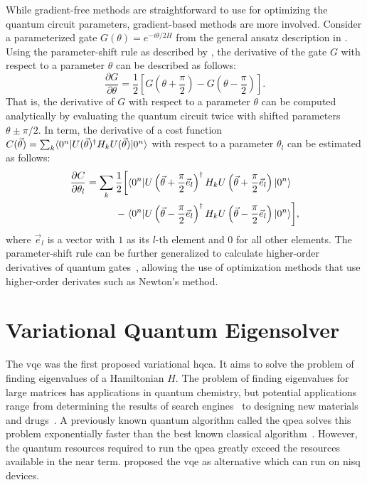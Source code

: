 While gradient-free methods are straightforward to use for optimizing the quantum circuit parameters, gradient-based methods are more involved.
Consider a parameterized gate $G(\theta) = e^{-i\theta/2 H}$ from the general ansatz description in .
Using the parameter-shift rule as described by \textcite{schuld2019evaluating}, the derivative of the gate $G$ with respect to a parameter $\theta$ can be described as follows:
\begin{equation}
\dfrac{\partial G}{\partial \theta} = \dfrac{1}{2}\left[G\left(\theta + \dfrac{\pi}{2}\right) - G\left(\theta - \dfrac{\pi}{2}\right)\right].
\end{equation}
That is, the derivative of $G$ with respect to a parameter $\theta$ can be computed analytically by evaluating the quantum circuit twice with shifted parameters $\theta \pm \pi/2$.
In term, the derivative of a cost function $C(\vec{\theta}) = \sum_k \langle{0^n}\vert U(\vec{\theta})^\dagger H_k U(\vec{\theta})\vert{0^n}\rangle$ with respect to a parameter $\theta_l$ can be estimated as follows:
\begin{equation}
\begin{aligned}
\dfrac{\partial C}{\partial \theta_l} = \sum_k \dfrac{1}{2} \bigg[&\langle{0^n}\vert U\left(\vec{\theta} + \dfrac{\pi}{2}\vec{e}_l\right)^\dagger H_k U\left(\vec{\theta} + \dfrac{\pi}{2}\vec{e}_l\right)\vert{0^n}\rangle \\
- \; &\langle{0^n}\vert U\left(\vec{\theta} - \dfrac{\pi}{2}\vec{e}_l\right)^\dagger H_k U\left(\vec{\theta} - \dfrac{\pi}{2}\vec{e}_l\right)\vert{0^n}\rangle\bigg],
\end{aligned}
\end{equation}
where $\vec{e}_l$ is a vector with $1$ as its $l$-th element and $0$ for all other elements.
The parameter-shift rule can be further generalized to calculate higher-order derivatives of quantum gates~\cite{mari2021estimating}, allowing the use of optimization methods that use higher-order derivates such as Newton's method.

\section{Variational Quantum Eigensolver}
The \gls{vqe} was the first proposed variational \gls{hqca}.
It aims to solve the problem of finding eigenvalues of a Hamiltonian $H$.
The problem of finding eigenvalues for large matrices has applications in quantum chemistry, but potential applications range from determining the results of search engines~\cite{page1999pagerank} to designing new materials and drugs~\cite{golub2000eigenvalue}.
A previously known quantum algorithm called the \gls{qpea} solves this problem exponentially faster than the best known classical algorithm~\cite{abrams1999quantum}.
However, the quantum resources required to run the \gls{qpea} greatly exceed the resources available in the near term.
\textcite{peruzzo2014variational} proposed the \gls{vqe} as alternative which can run on \gls{nisq} devices.

